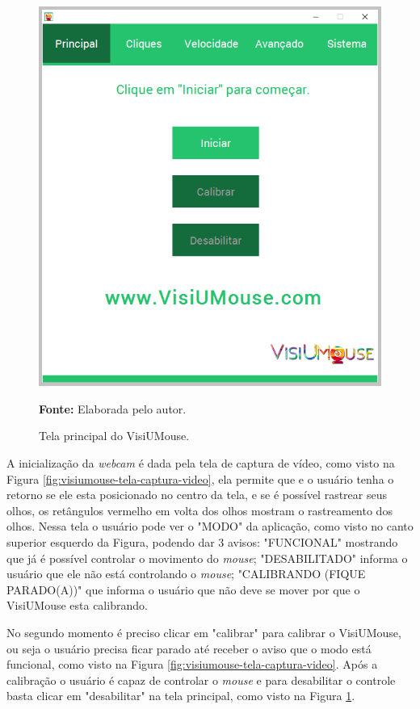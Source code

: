 \begin{figure}[H]
\caption{Tela principal do VisiUMouse.} 
\centering \includegraphics[scale=.5]{img/visiumouse-tela-principal-v216.png}

\textbf{Fonte:} Elaborada pelo autor.
\label{fig:visiumouse-tela-principal}
\end{figure}

A inicialização da \textit{webcam} é dada pela tela de captura de vídeo, como visto na Figura \ref{fig:visiumouse-tela-captura-video}, ela permite que e o usuário tenha o retorno se ele esta posicionado no centro da tela, e se é possível rastrear seus olhos, os retângulos vermelho em volta dos olhos mostram o rastreamento dos olhos. Nessa tela o usuário pode ver o "MODO" da aplicação, como visto no canto superior esquerdo da Figura, podendo dar 3 avisos: "FUNCIONAL" mostrando que já é possível controlar o movimento do \textit{mouse}; "DESABILITADO" informa o usuário que ele não está controlando o \textit{mouse}; "CALIBRANDO (FIQUE PARADO(A))" que informa o usuário que não deve se mover por que o VisiUMouse esta calibrando.

No segundo momento é preciso clicar em "calibrar" para calibrar o VisiUMouse, ou seja o usuário precisa ficar parado até receber o aviso que o modo está funcional, como visto na Figura \ref{fig:visiumouse-tela-captura-video}. Após a calibração o usuário é capaz de controlar o \textit{mouse} e para desabilitar o controle basta clicar em "desabilitar" na tela principal, como visto na Figura \ref{fig:visiumouse-tela-principal}.

